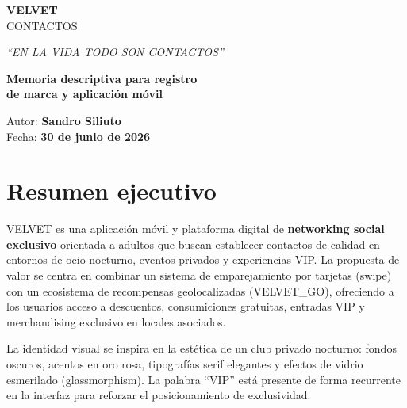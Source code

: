 \documentclass[11pt,a4paper]{article}
\begin{document}
\begin{titlepage}
\centering
\vspace*{2cm}


\vspace{1.5cm}

{\Huge\bfseries\color{velvetblack} VELVET}\\[0.3cm]
{\Large\color{velvetrose} CONTACTOS}

\vspace{0.8cm}

{\large\textit{``EN LA VIDA TODO SON CONTACTOS''}}

\vspace{2cm}

{\LARGE\bfseries Memoria descriptiva para registro}\\[0.3cm]
{\LARGE\bfseries de marca y aplicación móvil}

\vfill

{\large Autor: \textbf{Sandro Siliuto}}\\[0.3cm]
{\large Fecha: \textbf{30 de junio de 2026}}

\end{titlepage}

\tableofcontents
\newpage

\section{Resumen ejecutivo}

VELVET es una aplicación móvil y plataforma digital de \textbf{networking social exclusivo} orientada a adultos que buscan establecer contactos de calidad en entornos de ocio nocturno, eventos privados y experiencias VIP. La propuesta de valor se centra en combinar un sistema de emparejamiento por tarjetas (swipe) con un ecosistema de recompensas geolocalizadas (VELVET\_GO), ofreciendo a los usuarios acceso a descuentos, consumiciones gratuitas, entradas VIP y merchandising exclusivo en locales asociados.

La identidad visual se inspira en la estética de un club privado nocturno: fondos oscuros, acentos en oro rosa, tipografías serif elegantes y efectos de vidrio esmerilado (glassmorphism). La palabra ``VIP'' está presente de forma recurrente en la interfaz para reforzar el posicionamiento de exclusividad.
\end{document}
